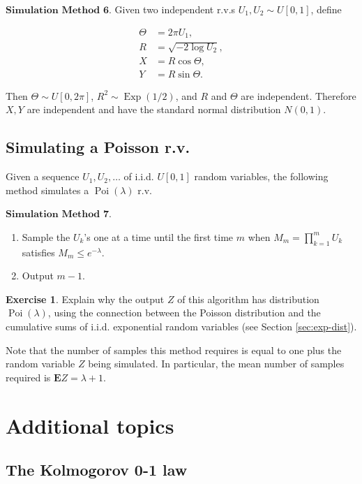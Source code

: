 \documentclass[11pt]{report}
\theoremstyle{plain}
\theoremstyle{definition}
\newtheorem{xexercise}[thm]{Exercise}
\begin{document}
$\textbf{Simulation Method 6.}$ Given two independent
r.v.s $U_1,U_2 \sim U[0,1]$, define

\begin{align*}
\Theta &= 2\pi U_1, \\
R &= \sqrt{-2 \log U_2}, \\
X &= R\cos \Theta, \\
Y &= R \sin \Theta.
\end{align*}

\noindent Then $\Theta \sim U[0,2\pi]$,
$R^2 \sim \operatorname{Exp}(1/2)$, and $R$ and
$\Theta$ are independent. Therefore $X,Y$ are
independent and have the standard normal distribution
$N(0,1)$.

\section{Simulating a Poisson r.v.}

Given a sequence $U_1,U_2,\ldots$ of i.i.d. $U[0,1]$
random variables, the following method simulates a
$\operatorname{Poi}(\lambda)$ r.v.

$\textbf{Simulation Method 7.}$

\begin{enumerate}[label=\arabic*.]
\item Sample the $U_k$'s one at a time until the first time
$m$ when $M_m =\prod_{k=1}^m U_k$ satisfies
$M_m \le e^{-\lambda}$.

\item Output $m-1$.
\end{enumerate}

\begin{xexercise}
Explain why the output $Z$ of this algorithm has
distribution $\operatorname{Poi}(\lambda)$, using the
connection between the Poisson distribution and the
cumulative sums of i.i.d. exponential random variables
(see Section \ref{sec:exp-dist}).
\end{xexercise}

\noindent Note that the number of samples this method requires
is equal to one plus the random variable $Z$ being
simulated. In particular, the mean number of samples
required is $\mathbf{E} Z = \lambda+1$.

\chapter{Additional topics}

\section{The Kolmogorov 0-1 law}
\end{document}
